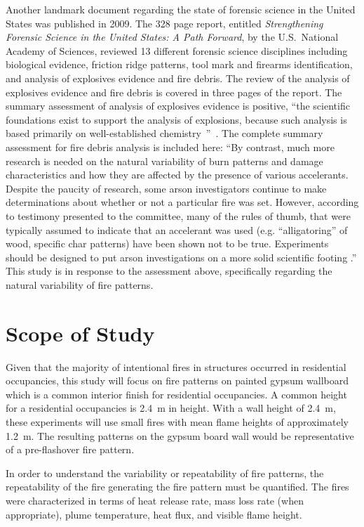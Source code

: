 \documentclass[twoside]{uocthesis}
\begin{document}
Another landmark document regarding the state of forensic science in the United States was published in 2009.  The 328 page report, entitled {\em Strengthening Forensic Science in the United States: A Path Forward}, by the U.S.~National Academy of Sciences, reviewed 13 different forensic science disciplines including biological evidence, friction ridge patterns, tool mark and firearms identification, and analysis of explosives evidence and fire debris.  The review of the analysis of explosives evidence and fire debris is covered in three pages of the report.  The summary assessment of analysis of explosives evidence is positive, ``the scientific foundations exist to support the analysis of explosions, because such analysis is based primarily on well-established chemistry~''~\cite{Forensic:2009}.  The complete summary assessment for fire debris analysis is included here: ``By contrast, much more research is needed on the natural variability of burn patterns and damage characteristics and how they are affected by the presence of various accelerants.  Despite the paucity of research, some arson investigators continue to make determinations about whether or not a particular fire was set.  However, according to testimony presented to the committee, many of the rules of thumb, that were typically assumed to indicate that an accelerant was used (e.g. ``alligatoring'' of wood, specific char patterns) have been shown not to be true.  Experiments should be designed to put arson investigations on a more solid scientific footing .''
This study is in response to the assessment above, specifically regarding the natural variability of fire patterns.


\section{Scope of Study}

Given that the majority of intentional fires in structures occurred in residential occupancies, this study will focus on fire patterns on painted gypsum wallboard which is a common interior finish for residential occupancies.  A common height for a residential occupancies is 2.4~m in height.  With a wall height of 2.4~m, these experiments will use small fires with mean flame heights of approximately 1.2~m.  The resulting patterns on the gypsum board wall would be representative of a pre-flashover fire pattern.

In order to understand the variability or repeatability of fire patterns, the repeatability of the fire generating the fire pattern must be quantified.  The fires were characterized in terms of heat release rate, mass loss rate (when appropriate), plume temperature, heat flux, and visible flame height.
\end{document}
